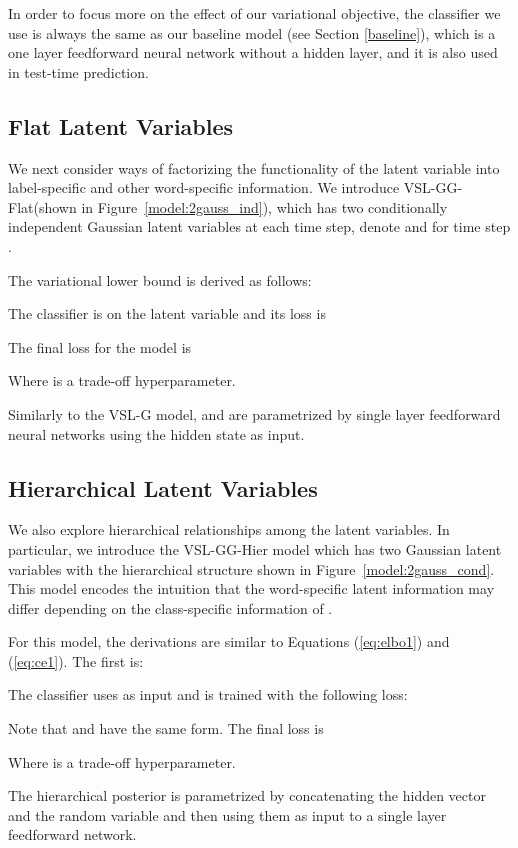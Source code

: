 \documentclass[11pt,a4paper]{article}
\newcommand{\vsmggflat}{VSL-GG-Flat\xspace}
\newcommand{\vsmgghier}{VSL-GG-Hier\xspace}
\begin{document}
In order to focus more on the effect of our variational objective, the classifier we use is always the same as our baseline model (see Section \ref{baseline}), which is a one layer feedforward neural network without a hidden layer, and it is also used in test-time prediction.


\subsection{Flat Latent Variables}
We next consider ways of factorizing the functionality of the latent variable into label-specific and other word-specific information.
We introduce \vsmggflat (shown in Figure~\ref{model:2gauss_ind}), which has two conditionally independent Gaussian latent variables at each time step, denote  and  for time step .

The variational lower bound is derived as follows:


\noindent The classifier  is on the latent variable  and its loss is


\noindent The final loss for the model is

Where  is a trade-off hyperparameter.

Similarly to the VSL-G model,  and  are parametrized by single layer feedforward neural networks using the hidden state  as input.

\subsection{Hierarchical Latent Variables}

We also explore hierarchical relationships among the latent variables.
In particular, we introduce the \vsmgghier model which has two Gaussian latent variables with the  hierarchical structure shown in Figure~\ref{model:2gauss_cond}. This model encodes the intuition that the word-specific latent information  may differ depending on the class-specific information of .

For this model, the derivations are similar to Equations (\ref{eq:elbo1}) and (\ref{eq:ce1}). The first is:


\noindent The classifier  uses  as input and is trained with the following loss:


\noindent Note that  and  have the same form.
The final loss is

Where  is a trade-off hyperparameter.

The hierarchical posterior  is parametrized by concatenating the hidden vector  and the random variable  and then using them as input to a single layer feedforward network.
\end{document}
